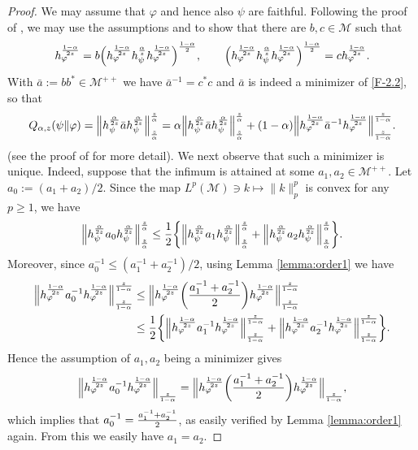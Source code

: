 \documentclass[12pt]{article}
\theoremstyle{definition}
\theoremstyle{remark}
\numberwithin{equation}{section}
\def\cM{\mathcal M}
\def\Me{\mathcal M}
\def\ffi{\varphi}
\begin{document}
\begin{proof} We may assume that $\varphi$ and hence also $\psi$ are faithful. Following
 the proof of \cite[Theorem 1(vi)]{kato2023onrenyi},  we may use the
assumptions and \cite[Lemma A.58]{hiai2021quantum} to show  that there are $b,c\in\cM$ such that
\begin{align}\label{eq:bc}
h_\ffi^{1-\alpha\over2z}
=b\Bigl(h_\ffi^{1-\alpha\over2z}h_\psi^{\alpha\over z}h_\ffi^{1-\alpha\over2z}\Bigr)^{1-\alpha\over2},\qquad
\Bigl(h_\ffi^{1-\alpha\over2z}h_\psi^{\alpha\over z}h_\ffi^{1-\alpha\over2z}\Bigr)^{1-\alpha\over2}
=ch_\ffi^{1-\alpha\over2z}.
\end{align}
With $\bar a:=bb^*\in\cM^{++}$ we have  $\bar a^{-1}=c^*c$ and $\bar a$ is indeed a minimizer of
\eqref{F-2.2}, so that
\begin{align}\label{eq:infimum}
Q_{\alpha,z}(\psi\|\ffi)
=\Big\|h_\psi^{\alpha\over2z}\bar ah_\psi^{\alpha\over2z}\Big\|_{z\over\alpha}^{z\over\alpha}
=\alpha\Big\|h_\psi^{\alpha\over2z}\bar ah_\psi^{\alpha\over2z}\Big\|_{z\over\alpha}^{z\over\alpha}
+(1-\alpha)\Big\|h_\ffi^{1-\alpha\over2z}\bar a^{-1}h_\ffi^{1-\alpha\over2z}\Big\|_{z\over
1-\alpha}^{z\over 1-\alpha}.
\end{align}
(see the proof of \cite[Theorem 1(vi)]{kato2023onrenyi} for more detail).
We next observe that such a minimizer is unique. Indeed, suppose that the infimum is
attained  at some $a_1,a_2\in \Me^{++}$. Let $a_0:=(a_1+a_2)/2$. Since the map 
$L^{p}(\cM)\ni k\mapsto\|k\|_{p}^{p}$ is convex for any $p\ge 1$, we have 
\[
\Big\|h_\psi^{\alpha\over2z}a_0h_\psi^{\alpha\over2z}\Big\|_{z\over\alpha}^{z\over\alpha}
\le{1\over2}\biggl\{\Big\|h_\psi^{\alpha\over2z}a_1
h_\psi^{\alpha\over2z}\Big\|_{z\over\alpha}^{z\over\alpha}
+\Big\|h_\psi^{\alpha\over2z}a_2h_\psi^{\alpha\over2z}\Big\|_{z\over\alpha}^{z\over\alpha}\biggr\}.
\]
Moreover, {since $a_0^{-1}\le(a_1^{-1}+a_2^{-1})/2$}, using Lemma \ref{lemma:order1}
we have
\begin{align*}
\Big\|h_\ffi^{1-\alpha\over2z}a_0^{-1}h_\ffi^{1-\alpha\over2z}\Big\|_{z\over1-\alpha}^{z\over1-\alpha}
&\le\Big\|h_\ffi^{1-\alpha\over2z}\biggl({a_1^{-1}+a_2^{-1}\over2}\biggr)
h_\ffi^{1-\alpha\over2z}\Big\|_{z\over1-\alpha}^{z\over1-\alpha} \\
&\le{1\over2}\biggl\{\Big\|h_\ffi^{1-\alpha\over2z}a_1^{-1}
h_\ffi^{1-\alpha\over2z}\Big\|_{z\over1-\alpha}^{z\over1-\alpha}
+\Big\|h_\ffi^{1-\alpha\over2z}a_2^{-1}
h_\ffi^{1-\alpha\over2z}\Big\|_{z\over1-\alpha}^{z\over1-\alpha}\biggr\}.
\end{align*}
Hence the assumption of $a_1,a_2$ being a minimizer gives
\[
\Big\|h_\ffi^{1-\alpha\over2z}a_0^{-1}h_\ffi^{1-\alpha\over2z}\Big\|_{z\over1-\alpha}
=\Big\|h_\ffi^{1-\alpha\over2z}\biggl({a_1^{-1}+a_2^{-1}\over2}\biggr)
h_\ffi^{1-\alpha\over2z}\Big\|_{z\over1-\alpha},
\]
which implies that $a_0^{-1}={a_1^{-1}+a_2^{-1}\over2}$, as easily verified by Lemma \ref{lemma:order1}
again. From this we easily have $a_1=a_2$.


\end{proof}
\end{document}
